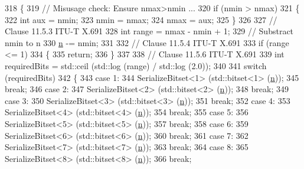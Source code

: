 \begin{DoxyCode}
318 \{
319   \textcolor{comment}{// Misusage check: Ensure nmax>nmin ...}
320   \textcolor{keywordflow}{if} (nmin > nmax)
321     \{
322       \textcolor{keywordtype}{int} aux = nmin;
323       nmin = nmax;
324       nmax = aux;
325     \}
326 
327   \textcolor{comment}{// Clause 11.5.3 ITU-T X.691}
328   \textcolor{keywordtype}{int} range = nmax - nmin + 1;
329   \textcolor{comment}{// Substract nmin to n}
330   \hyperlink{namespacesample-rng-plot_aeb5ee5c431e338ef39b7ac5431242e1d}{n} -= nmin;
331 
332   \textcolor{comment}{// Clause 11.5.4 ITU-T X.691}
333   \textcolor{keywordflow}{if} (range <= 1)
334     \{
335       \textcolor{keywordflow}{return};
336     \}
337 
338   \textcolor{comment}{// Clause 11.5.6 ITU-T X.691}
339   \textcolor{keywordtype}{int} requiredBits = std::ceil (std::log (range) / std::log (2.0));
340 
341   \textcolor{keywordflow}{switch} (requiredBits)
342     \{
343     \textcolor{keywordflow}{case} 1:
344       SerializeBitset<1> (std::bitset<1> (\hyperlink{namespacesample-rng-plot_aeb5ee5c431e338ef39b7ac5431242e1d}{n}));
345       \textcolor{keywordflow}{break};
346     \textcolor{keywordflow}{case} 2:
347       SerializeBitset<2> (std::bitset<2> (\hyperlink{namespacesample-rng-plot_aeb5ee5c431e338ef39b7ac5431242e1d}{n}));
348       \textcolor{keywordflow}{break};
349     \textcolor{keywordflow}{case} 3:
350       SerializeBitset<3> (std::bitset<3> (\hyperlink{namespacesample-rng-plot_aeb5ee5c431e338ef39b7ac5431242e1d}{n}));
351       \textcolor{keywordflow}{break};
352     \textcolor{keywordflow}{case} 4:
353       SerializeBitset<4> (std::bitset<4> (\hyperlink{namespacesample-rng-plot_aeb5ee5c431e338ef39b7ac5431242e1d}{n}));
354       \textcolor{keywordflow}{break};
355     \textcolor{keywordflow}{case} 5:
356       SerializeBitset<5> (std::bitset<5> (\hyperlink{namespacesample-rng-plot_aeb5ee5c431e338ef39b7ac5431242e1d}{n}));
357       \textcolor{keywordflow}{break};
358     \textcolor{keywordflow}{case} 6:
359       SerializeBitset<6> (std::bitset<6> (\hyperlink{namespacesample-rng-plot_aeb5ee5c431e338ef39b7ac5431242e1d}{n}));
360       \textcolor{keywordflow}{break};
361     \textcolor{keywordflow}{case} 7:
362       SerializeBitset<7> (std::bitset<7> (\hyperlink{namespacesample-rng-plot_aeb5ee5c431e338ef39b7ac5431242e1d}{n}));
363       \textcolor{keywordflow}{break};
364     \textcolor{keywordflow}{case} 8:
365       SerializeBitset<8> (std::bitset<8> (\hyperlink{namespacesample-rng-plot_aeb5ee5c431e338ef39b7ac5431242e1d}{n}));
366       \textcolor{keywordflow}{break};

\end{DoxyCode}
